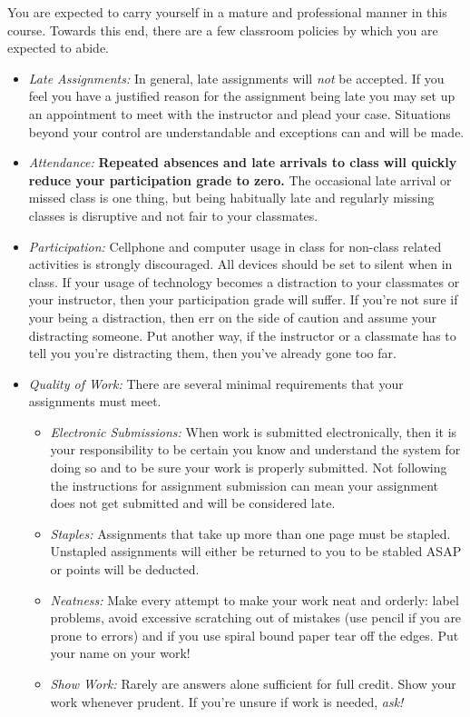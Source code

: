 \documentclass[]{tufte-handout}
\begin{document}
You are expected to carry yourself in a mature and professional manner in this course. Towards this end, there are a few classroom policies by which you are expected to abide.
\begin{itemize}

\item \textit{Late Assignments: } In general, late assignments will \textit{not} be accepted.  If you feel you have a justified reason for the assignment being late you may set up an appointment to meet with the instructor and plead your case.  Situations beyond your control are understandable and exceptions can and will be made.

\item \textit{Attendance: } \textbf{Repeated absences and late arrivals to class will quickly reduce your participation grade to zero.}  The occasional late arrival or missed class is one thing, but being habitually late and regularly missing classes is disruptive and not fair to your classmates.

\item \textit{Participation: }  Cellphone and computer usage in class for non-class related activities is strongly discouraged.  All devices should be set to silent when in class.  If your usage of technology becomes a distraction to your classmates or your instructor, then your participation grade will suffer.  If you're not sure if your being a distraction, then err on the side of caution and assume your distracting someone.  Put another way, if the instructor or a classmate has to tell you you're distracting them, then you've already gone too far.

\item \textit{Quality of Work:} There are several minimal requirements that your assignments must meet.
\begin{itemize}
\item \textit{Electronic Submissions:}  When work is submitted electronically, then it is your responsibility to be certain you know and understand the system for doing so and to be sure your work is properly submitted. Not following the instructions for assignment submission can mean your assignment does not get submitted and will be considered late.

\item \textit{Staples:} Assignments that take up more than one page must be stapled.  Unstapled assignments will either be returned to you to be stabled ASAP or points will be deducted.

\item \textit{Neatness:}  Make every attempt to make your work neat and orderly:  label problems, avoid excessive scratching out of mistakes (use pencil if you are prone to errors) and if you use spiral bound paper tear off the edges. Put your name on your work!

\item \textit{Show Work:} Rarely are answers alone sufficient for full credit.  Show your work whenever prudent.  If you're unsure if work is needed, \textit{ask!}
\end{itemize}

\end{itemize}
\end{document}
